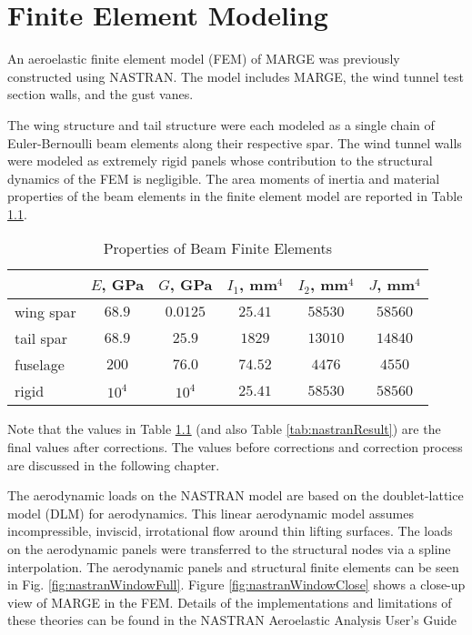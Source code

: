 \chapter{Finite Element Modeling}
\label{ch:nastran}

An aeroelastic finite element model (FEM) of MARGE was previously constructed using NASTRAN. The model includes MARGE, the wind tunnel test section walls, and the gust vanes.


The wing structure and tail structure were each modeled as a single chain of Euler-Bernoulli beam elements along their respective spar. The wind tunnel walls were modeled as extremely rigid panels whose contribution to the structural dynamics of the FEM is negligible. The area moments of inertia and material properties of the beam elements in the finite element model are reported in Table \ref{tab:beamInertia}.
\begin{table}[H]
    \centering
    \caption{Properties of Beam Finite Elements}
    \begin{tabular}{lccccc}
        \hline\hline
                  & $E$, GPa & $G$, GPa & $I_1$, mm$^4$ & $I_2$, mm$^4$ & $J$, mm$^4$ \\
        \hline
        wing spar & $68.9$   & $0.0125$ & $25.41$       & $58530$       & $58560$     \\
        tail spar & $68.9$   & $25.9$   & $1829$        & $13010$       & $14840$     \\
        fuselage  & $200$    & $76.0$   & $74.52$       & $4476 $       & $4550 $     \\
        rigid     & $10^4$   & $10^4$   & $25.41$       & $58530$       & $58560$     \\
        \hline\hline
    \end{tabular}
    \label{tab:beamInertia}
\end{table}
Note that the values in Table \ref{tab:beamInertia} (and also Table \ref{tab:nastranResult}) are the final values after corrections. The values before corrections and correction process are discussed in the following chapter.

The aerodynamic loads on the NASTRAN model are based on the doublet-lattice model (DLM) for aerodynamics. This linear aerodynamic model assumes incompressible, inviscid, irrotational flow around thin lifting surfaces. The loads on the aerodynamic panels were transferred to the structural nodes via a spline interpolation. The aerodynamic panels and structural finite elements can be seen in Fig. \ref{fig:nastranWindowFull}. Figure \ref{fig:nastranWindowClose} shows a close-up view of MARGE in the FEM. Details of the implementations and limitations of these theories can be found in the NASTRAN Aeroelastic Analysis User's Guide \cite{Siemens2020}

